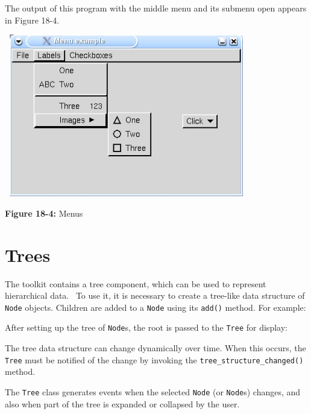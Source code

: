 The output of this program with the middle menu and its submenu open
appears in Figure 18-4.\\

\begin{center}
\includegraphics[width=4.2043in,height=2.7925in]{ub-img/ub-img53.jpg}
\end{center}

{\sffamily\bfseries Figure 18-4:}
{\sffamily Menus}

\section{Trees}

The toolkit contains a tree component, which can be used to represent
hierarchical data. \ To use it, it is necessary to create a tree-like
data structure of \texttt{Node} objects. Children are added to a
\texttt{Node} using its \texttt{add()} method. For example:


After setting up the tree of \texttt{Node}s, the root is passed
to the \texttt{Tree} for display:


\noindent The tree data structure can change dynamically over time. When this
occurs, the \texttt{Tree} must be notified of the change by invoking
the \texttt{tree\_structure\_changed()} method.

The \texttt{Tree} class generates events when the selected \texttt{Node}
(or \texttt{Node}s) changes, and also when part of the tree is expanded
or collapsed by the user.

